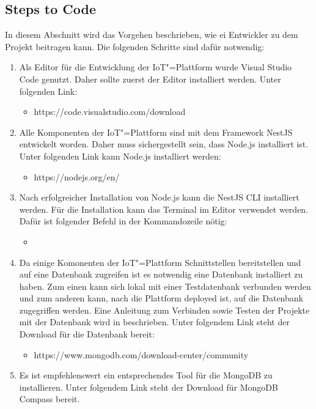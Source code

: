 \subsection{Steps to Code}
\label{sec:iot:stepstocode}
In diesem Abschnitt wird das Vorgehen beschrieben, wie ei Entwickler zu dem Projekt beitragen kann. Die folgenden Schritte sind dafür notwendig: \newline
\begin{enumerate}
	\item Als Editor für die Entwicklung der IoT"=Plattform wurde Visual Studio Code genutzt. Daher sollte zuerst der Editor installiert werden. Unter folgenden Link:
	\begin{itemize}
		\item https://code.visualstudio.com/download
	\end{itemize}
	\item Alle Komponenten der IoT"=Plattform sind mit dem Framework NestJS entwickelt worden. Daher muss sichergestellt sein, dass Node.js installiert ist. Unter folgenden Link kann Node.js installiert werden: 
	\begin{itemize}
		\item{https://nodejs.org/en/}
	\end{itemize}
	\item Nach erfolgreicher Installation von Node.js kann die NestJS CLI installiert werden. Für die Installation kann das Terminal im Editor verwendet werden. Dafür ist folgender Befehl in der Kommandozeile nötig: 
	\begin{itemize}
		\item{}
	\end{itemize}
	\item Da einige Komonenten der IoT"=Plattform Schnittstellen bereitstellen und auf eine Datenbank zugreifen ist es notwendig eine Datenbank installiert zu haben. Zum einen kann sich lokal mit einer Testdatenbank verbunden werden und zum anderen kann, nach die Plattform deployed ist, auf die Datenbank zugegriffen werden. Eine Anleitung zum Verbinden sowie Testen der Projekte mit der Datenbank wird in  beschrieben. Unter folgendem Link steht der Download für die Datenbank bereit: 
	\begin{itemize}
		\item {https://www.mongodb.com/download-center/community}
	\end{itemize}
	\item Es ist empfehlenswert ein entsprechendes Tool für die MongoDB zu installieren. Unter folgendem Link steht der Download für MongoDB Compass bereit. 

\end{enumerate}
